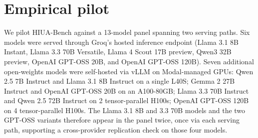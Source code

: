 %





\section{Empirical pilot}
\label{sec:pilot}

We pilot HIUA-Bench against a 13-model panel spanning two serving paths. Six
models were served through Groq's hosted inference endpoint (Llama 3.1 8B
Instant, Llama 3.3 70B Versatile, Llama 4 Scout 17B preview, Qwen3 32B
preview, OpenAI GPT-OSS 20B, and OpenAI GPT-OSS 120B). Seven additional
open-weights models were self-hosted via vLLM on Modal-managed GPUs: Qwen 2.5
7B Instruct and Llama 3.1 8B Instruct on a single L40S; Gemma 2 27B Instruct
and OpenAI GPT-OSS 20B on an A100-80GB; Llama 3.3 70B Instruct and Qwen 2.5
72B Instruct on 2 tensor-parallel H100s; OpenAI GPT-OSS 120B on 4
tensor-parallel H100s. The Llama 3.1 8B and 3.3 70B models and the two
GPT-OSS variants therefore appear in the panel twice, once via each serving
path, supporting a cross-provider replication check on those four models.

